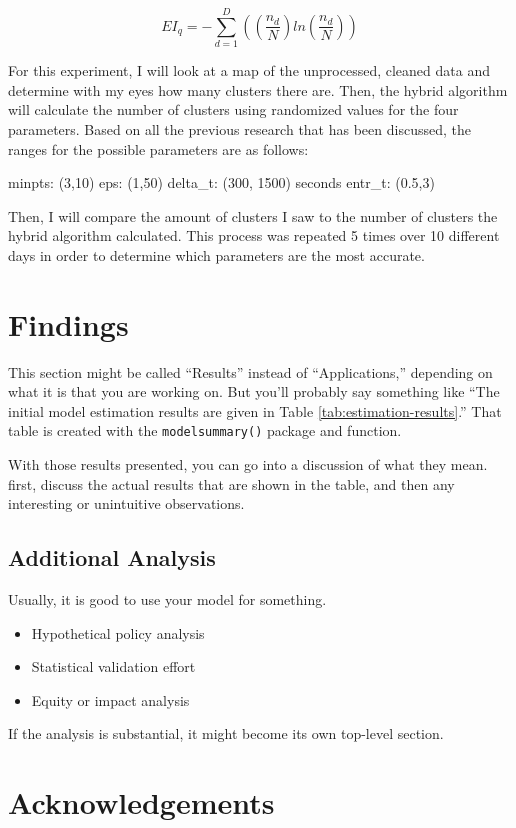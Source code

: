 \documentclass[3p, authoryear]{elsarticle} %
\providecommand{\tightlist}{%
  \setlength{\itemsep}{0pt}\setlength{\parskip}{0pt}}
\begin{document}
\begin{equation}
  EI_q = -\sum_{d=1}^D ((\frac{n_d}{N})ln(\frac{n_d}{N}))
\end{equation}

For this experiment, I will look at a map of the unprocessed, cleaned data and determine with my eyes how many clusters there are. Then, the hybrid algorithm will calculate the number of clusters using randomized values for the four parameters. Based on all the previous research that has been discussed, the ranges for the possible parameters are as follows:

minpts: (3,10)
eps: (1,50)
delta\_t: (300, 1500) seconds
entr\_t: (0.5,3)

Then, I will compare the amount of clusters I saw to the number of clusters the hybrid algorithm calculated. This process was repeated 5 times over 10 different days in order to determine which parameters are the most accurate.

\hypertarget{findings}{%
\section{Findings}\label{findings}}

This section might be called ``Results'' instead of ``Applications,'' depending
on what it is that you are working on. But you'll probably say something like
``The initial model estimation results are given in Table \ref{tab:estimation-results}.''
That table is created with the \texttt{modelsummary()} package and function.

With those results presented, you can go into a discussion of what they mean.
first, discuss the actual results that are shown in the table, and then any
interesting or unintuitive observations.

\hypertarget{additional-analysis}{%
\subsection{Additional Analysis}\label{additional-analysis}}

Usually, it is good to use your model for something.

\begin{itemize}
\tightlist
\item
  Hypothetical policy analysis
\item
  Statistical validation effort
\item
  Equity or impact analysis
\end{itemize}

If the analysis is substantial, it might become its own top-level section.

\hypertarget{acknowledgements}{%
\section*{Acknowledgements}\label{acknowledgements}}


\end{document}
